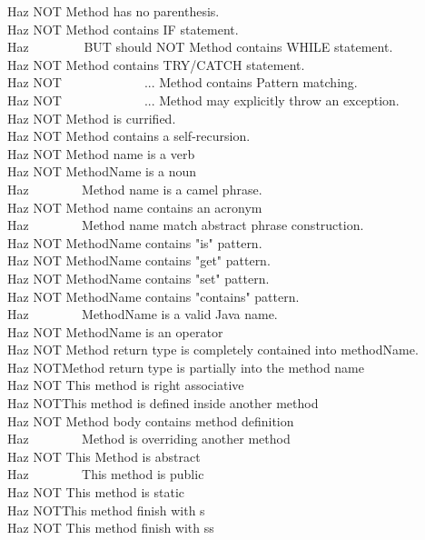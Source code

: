 \documentclass[12pt]{article}
\begin{document}
{Haz NOT                \>Method has no parenthesis.\\
Haz NOT                \>Method contains IF statement.\\
Haz \ \ \ \ \ \ \ \ BUT should NOT Method contains WHILE statement.\\
Haz NOT                \>Method contains TRY/CATCH statement.\\
Haz NOT\ \ \ \ \ \ \ \ \ \ \ \ \ ...       \>Method contains Pattern matching.\\
Haz NOT\ \ \ \ \ \ \ \ \ \ \ \ \ ...       \>Method may explicitly throw an exception.\\
Haz NOT                \>Method is currified.\\
Haz NOT               \> Method contains a self-recursion.\\
Haz NOT               \> Method name is a verb\\
Haz NOT               \> MethodName is a noun\\
Haz  \ \ \ \ \ \ \                    \> Method name is a camel phrase.\\
Haz NOT               \> Method name contains an acronym\\
Haz  \ \ \ \ \ \ \                   \> Method name match abstract phrase construction.\\
Haz NOT               \> MethodName contains "is" pattern.\\
Haz NOT                \>MethodName contains "get" pattern.\\
Haz NOT               \> MethodName contains "set" pattern.\\
Haz NOT               \> MethodName contains "contains" pattern.\\
Haz  \ \ \ \ \ \ \                   \> MethodName is a valid Java name.\\
Haz NOT               \> MethodName is an operator\\
Haz NOT               \> Method return type is completely contained into methodName. \\
Haz NOT\>Method return type is partially into the method name\\
Haz NOT               \> This method is right associative\\
Haz NOT\>This method is defined inside another method\\
Haz NOT               \> Method body contains method definition\\
Haz  \ \ \ \ \ \ \           \>         Method is overriding another method\\
Haz NOT        \>        This Method is abstract\\
Haz  \ \ \ \ \ \ \            \>        This method is public\\
Haz NOT             \>   This method is static\\
Haz NOT\>This method finish with s\\
Haz NOT           \>     This method finish with ss}


\newpage



\end{document}
